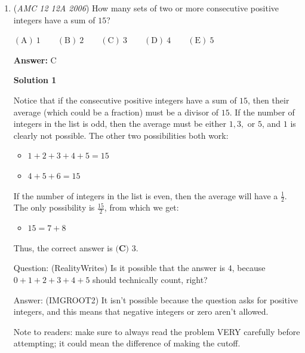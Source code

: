 \begin{enumerate}
 We have $s=.6d$, so $m=1.2s=1.2(.6d)=.72d$.  

 The sum of their ages is $m+s+d=.72d+.6d+d=2.32d$.  Therefore, $2.32d=23.2$, and $d=10$.

 The smallest positive integer more than $7.2$ is $8$, so Mary will be $\boxed {\textbf {(B) } 8}$ on her next birthday.

 


	\item (\textit{AMC 12 12A 2006}) How many sets of two or more consecutive positive integers have a sum of $15$?


 $\mathrm{(A) \ } 1\qquad \mathrm{(B) \ } 2\qquad \mathrm{(C) \ } 3\qquad \mathrm{(D) \ } 4\qquad \mathrm{(E) \ }  5$

 \textbf{Answer: }C



\textbf{Solution 1}

Notice that if the consecutive positive integers have a sum of $15$, then their average (which could be a fraction) must be a divisor of $15$. If the number of integers in the list is odd, then the average must be either $1, 3,$ or $5$, and $1$ is clearly not possible. The other two possibilities both work:

 
            \begin{itemize}
        \item $1 + 2 + 3 + 4 + 5 = 15$
        \item $4 + 5 + 6 = 15$
            \end{itemize}
            If the number of integers in the list is even, then the average will have a $\frac{1}{2}$. The only possibility is $\frac{15}{2}$, from which we get:

 
            \begin{itemize}
        \item $15 = 7 + 8$
            \end{itemize}
            Thus, the correct answer is $\boxed{\textbf{(C) }3}.$

 
Question: (RealityWrites) Is it possible that the answer is $4$, because $0+1+2+3+4+5$ should technically count, right?

 Answer: (IMGROOT2) It isn't possible because the question asks for positive integers, and this means that negative integers or zero aren't allowed.

 Note to readers: make sure to always read the problem VERY carefully before attempting; it could mean the difference of making the cutoff.


\end{enumerate}
